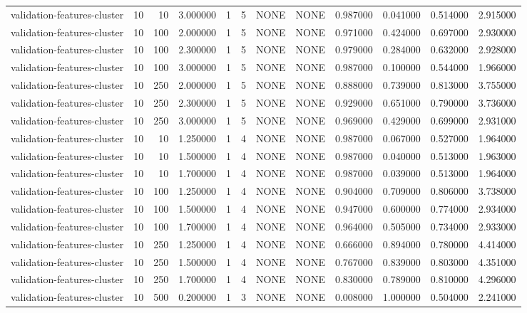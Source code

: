 \begin{tabular}{lrrrllllrrrr}
validation-features-cluster & 10 & 10 & 3.000000 & 1 & 5 & NONE & NONE & 0.987000 & 0.041000 & 0.514000 & 2.915000 \\
validation-features-cluster & 10 & 100 & 2.000000 & 1 & 5 & NONE & NONE & 0.971000 & 0.424000 & 0.697000 & 2.930000 \\
validation-features-cluster & 10 & 100 & 2.300000 & 1 & 5 & NONE & NONE & 0.979000 & 0.284000 & 0.632000 & 2.928000 \\
validation-features-cluster & 10 & 100 & 3.000000 & 1 & 5 & NONE & NONE & 0.987000 & 0.100000 & 0.544000 & 1.966000 \\
validation-features-cluster & 10 & 250 & 2.000000 & 1 & 5 & NONE & NONE & 0.888000 & 0.739000 & 0.813000 & 3.755000 \\
validation-features-cluster & 10 & 250 & 2.300000 & 1 & 5 & NONE & NONE & 0.929000 & 0.651000 & 0.790000 & 3.736000 \\
validation-features-cluster & 10 & 250 & 3.000000 & 1 & 5 & NONE & NONE & 0.969000 & 0.429000 & 0.699000 & 2.931000 \\
validation-features-cluster & 10 & 10 & 1.250000 & 1 & 4 & NONE & NONE & 0.987000 & 0.067000 & 0.527000 & 1.964000 \\
validation-features-cluster & 10 & 10 & 1.500000 & 1 & 4 & NONE & NONE & 0.987000 & 0.040000 & 0.513000 & 1.963000 \\
validation-features-cluster & 10 & 10 & 1.700000 & 1 & 4 & NONE & NONE & 0.987000 & 0.039000 & 0.513000 & 1.964000 \\
validation-features-cluster & 10 & 100 & 1.250000 & 1 & 4 & NONE & NONE & 0.904000 & 0.709000 & 0.806000 & 3.738000 \\
validation-features-cluster & 10 & 100 & 1.500000 & 1 & 4 & NONE & NONE & 0.947000 & 0.600000 & 0.774000 & 2.934000 \\
validation-features-cluster & 10 & 100 & 1.700000 & 1 & 4 & NONE & NONE & 0.964000 & 0.505000 & 0.734000 & 2.933000 \\
validation-features-cluster & 10 & 250 & 1.250000 & 1 & 4 & NONE & NONE & 0.666000 & 0.894000 & 0.780000 & 4.414000 \\
validation-features-cluster & 10 & 250 & 1.500000 & 1 & 4 & NONE & NONE & 0.767000 & 0.839000 & 0.803000 & 4.351000 \\
validation-features-cluster & 10 & 250 & 1.700000 & 1 & 4 & NONE & NONE & 0.830000 & 0.789000 & 0.810000 & 4.296000 \\
validation-features-cluster & 10 & 500 & 0.200000 & 1 & 3 & NONE & NONE & 0.008000 & 1.000000 & 0.504000 & 2.241000 \\

\end{tabular}
